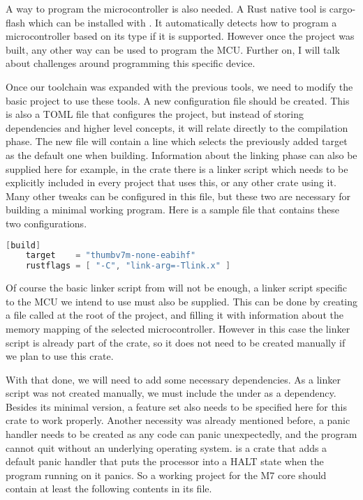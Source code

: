 A way to program the microcontroller is also needed. A Rust native tool is cargo-flash which can be installed with . It automatically detects how to program a microcontroller based on its type if it is supported. However once the project was built, any other way can be used to program the MCU. Further on, I will talk about challenges around programming this specific device.

Once our toolchain was expanded with the previous tools, we need to modify the basic project to use these tools. A new configuration file  should be created. This is also a TOML file that configures the project, but instead of storing dependencies and higher level concepts, it will relate directly to the compilation phase. The new file will contain a line which selects the previously added target as the default one when building. Information about the linking phase can also be supplied here for example, in the  crate there is a linker script  which needs to be explicitly included in every project that uses this, or any other crate using it. Many other tweaks can be configured in this file, but these two are necessary for building a minimal working program. Here is a sample file that contains these two configurations.

\begin{lstlisting}[language=C,frame=single,float=!ht]
    [build]
    target    = "thumbv7m-none-eabihf"
    rustflags = [ "-C", "link-arg=-Tlink.x" ]
\end{lstlisting}

Of course the basic linker script from will not be enough, a linker script specific to the MCU we intend to use must also be supplied. This can be done by creating a file called  at the root of the project, and filling it with information about the memory mapping of the selected microcontroller. However in this case the linker script is already part of the  crate, so it does not need to be created manually if we plan to use this crate.

With that done, we will need to add some necessary dependencies. As a  linker script was not created manually, we must include the  under as a dependency. Besides its minimal version, a feature set also needs to be specified here for this crate to work properly. Another necessity was already mentioned before, a panic handler needs to be created as any code can panic unexpectedly, and the program cannot quit without an underlying operating system.  is a crate that adds a default panic handler that puts the processor into a HALT state when the program running on it panics. So a working project for the M7 core should contain at least the following contents in its  file.

